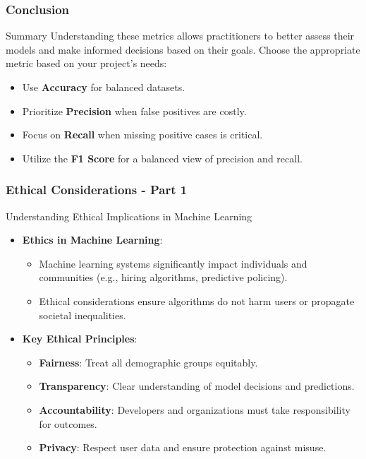 \documentclass[aspectratio=169]{beamer}
\begin{document}
\begin{frame}[fragile]
    \frametitle{Conclusion}
    \begin{block}{Summary}
        Understanding these metrics allows practitioners to better assess their models and make informed decisions based on their goals. 
        Choose the appropriate metric based on your project's needs:
    \end{block}
    \begin{itemize}
        \item Use \textbf{Accuracy} for balanced datasets.
        \item Prioritize \textbf{Precision} when false positives are costly.
        \item Focus on \textbf{Recall} when missing positive cases is critical.
        \item Utilize the \textbf{F1 Score} for a balanced view of precision and recall.
    \end{itemize}
\end{frame}

\begin{frame}[fragile]
    \frametitle{Ethical Considerations - Part 1}
    \begin{block}{Understanding Ethical Implications in Machine Learning}
        \begin{itemize}
            \item \textbf{Ethics in Machine Learning}:
            \begin{itemize}
                \item Machine learning systems significantly impact individuals and communities (e.g., hiring algorithms, predictive policing).
                \item Ethical considerations ensure algorithms do not harm users or propagate societal inequalities.
            \end{itemize}
            \item \textbf{Key Ethical Principles}:
            \begin{itemize}
                \item \textbf{Fairness}: Treat all demographic groups equitably.
                \item \textbf{Transparency}: Clear understanding of model decisions and predictions.
                \item \textbf{Accountability}: Developers and organizations must take responsibility for outcomes.
                \item \textbf{Privacy}: Respect user data and ensure protection against misuse.
            \end{itemize}
        \end{itemize}
    \end{block}
\end{frame}
\end{document}

